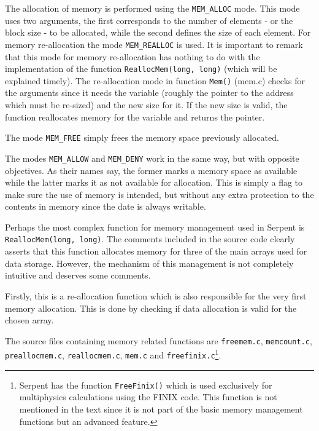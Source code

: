 \documentclass[twoside,a4paper,12pt,english]{anstrans}
\begin{document}
The allocation of memory is performed using the \texttt{MEM\_ALLOC} mode. This mode uses two arguments, the first
corresponds to the number of elements - or the block size - to be allocated, while the second defines the size of each element.
For memory re-allocation the mode \texttt{MEM\_REALLOC} is used. It is important to remark that this mode for memory re-allocation
has nothing to do with the implementation of the function \texttt{ReallocMem(long, long)} (which will be explained timely). The re-allocation mode
in function \texttt{Mem()} (mem.c) checks for the arguments since it needs the variable (roughly the pointer to the address which must
be re-sized) and the new size for it. If the new size is valid, the function reallocates memory for the variable and returns the pointer.

%

The mode \texttt{MEM\_FREE} simply frees the memory space previously allocated.

The modes \texttt{MEM\_ALLOW} and \texttt{MEM\_DENY} work in the same way, but with opposite objectives. As
their names say, the former marks a memory space%
as available while the latter marks it as not available for allocation. This is simply a flag to make sure
the use of memory is intended, but without any extra protection to the contents in memory since the
date is always writable.

Perhaps the most complex function for memory management used in Serpent is \texttt{ReallocMem(long, long)}.
The comments included in the source code clearly asserts that this function allocates memory for
three of the main arrays used for data storage. However, the mechanism of this management is not
completely intuitive and deserves some comments.

Firstly, this is a re-allocation function which is also responsible for the very first memory
allocation. This is done by checking if data allocation is valid for the chosen array.

The source files containing memory related functions are \texttt{freemem.c},
\texttt{memcount.c}, \texttt{preallocmem.c}, \texttt{reallocmem.c}, \texttt{mem.c}
and \texttt{freefinix.c}\footnote{Serpent has the function \texttt{FreeFinix()} which
  is used exclusively for multiphysics calculations using the FINIX code. This function
  is not mentioned in the text since it is not part of the basic memory management functions
  but an advanced feature.}.
\end{document}
